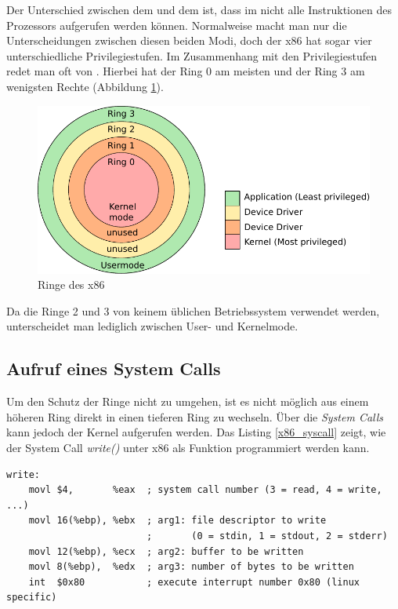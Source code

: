 Der Unterschied zwischen dem  und dem  ist, dass im  nicht alle Instruktionen
des Prozessors aufgerufen werden können. Normalweise macht man nur die Unterscheidungen zwischen diesen beiden Modi, doch der
x86 hat sogar vier unterschiedliche Privilegiestufen. Im Zusammenhang mit den Privilegiestufen redet man oft von .
Hierbei hat der Ring 0 am meisten und der Ring 3 am wenigsten Rechte (Abbildung \ref{fig:x86_rings}).

\begin{figure}[h!]
   \begin{center}
      \includegraphics{images/x86_rings}
   \end{center}
   \caption[Ringe des x86]{Ringe des x86\footnotemark}
   \label{fig:x86_rings}
\end{figure} 

Da die Ringe 2 und 3 von keinem üblichen Betriebssystem verwendet werden, unterscheidet man lediglich zwischen User- und Kernelmode.

\subsection{Aufruf eines System Calls}

Um den Schutz der Ringe nicht zu umgehen, ist es nicht möglich aus einem höheren Ring direkt in einen tieferen Ring zu wechseln. Über die
\emph{System Calls} kann jedoch der Kernel aufgerufen werden. Das Listing \ref{x86_syscall} zeigt, wie der System Call \emph{write()} 
unter x86 als Funktion programmiert werden kann.

\begin{lstlisting}[label=x86_syscall,caption=Write system call]
write:
    movl $4,       %eax  ; system call number (3 = read, 4 = write, ...)
    movl 16(%ebp), %ebx  ; arg1: file descriptor to write 
                         ;       (0 = stdin, 1 = stdout, 2 = stderr)
    movl 12(%ebp), %ecx  ; arg2: buffer to be written
    movl 8(%ebp),  %edx  ; arg3: number of bytes to be written
    int  $0x80           ; execute interrupt number 0x80 (linux specific)
\end{lstlisting} \hfill

